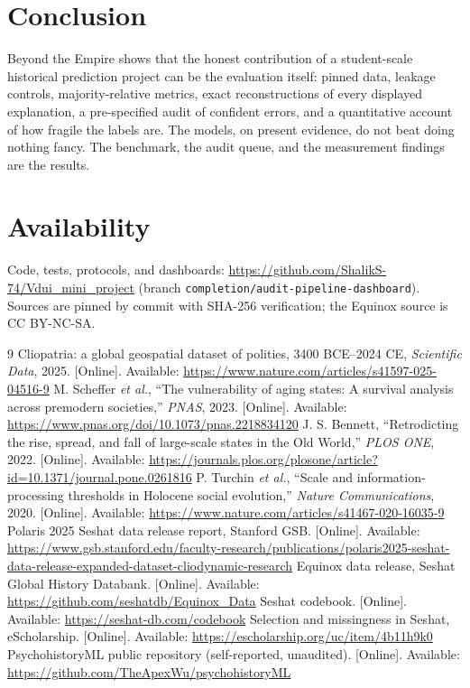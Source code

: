 \documentclass[conference]{IEEEtran}
\begin{document}
\section{Conclusion}
Beyond the Empire shows that the honest contribution of a student-scale historical
prediction project can be the evaluation itself: pinned data, leakage controls,
majority-relative metrics, exact reconstructions of every displayed explanation, a
pre-specified audit of confident errors, and a quantitative account of how fragile
the labels are. The models, on present evidence, do not beat doing nothing fancy.
The benchmark, the audit queue, and the measurement findings are the results.

\section*{Availability}
Code, tests, protocols, and dashboards: \url{https://github.com/ShalikS-74/Vdui_mini_project}
(branch \texttt{completion/audit-pipeline-dashboard}). Sources are pinned by commit
with SHA-256 verification; the Equinox source is CC BY-NC-SA.

\begin{thebibliography}{9}
Cliopatria: a global geospatial dataset of polities, 3400 BCE--2024 CE,
\emph{Scientific Data}, 2025. [Online]. Available:
\url{https://www.nature.com/articles/s41597-025-04516-9}
M. Scheffer \emph{et al.}, ``The vulnerability of aging states: A survival
analysis across premodern societies,'' \emph{PNAS}, 2023. [Online]. Available:
\url{https://www.pnas.org/doi/10.1073/pnas.2218834120}
J. S. Bennett, ``Retrodicting the rise, spread, and fall of large-scale states in
the Old World,'' \emph{PLOS ONE}, 2022. [Online]. Available:
\url{https://journals.plos.org/plosone/article?id=10.1371/journal.pone.0261816}
P. Turchin \emph{et al.}, ``Scale and information-processing thresholds in
Holocene social evolution,'' \emph{Nature Communications}, 2020. [Online].
Available: \url{https://www.nature.com/articles/s41467-020-16035-9}
Polaris 2025 Seshat data release report, Stanford GSB. [Online]. Available:
\url{https://www.gsb.stanford.edu/faculty-research/publications/polaris2025-seshat-data-release-expanded-dataset-cliodynamic-research}
Equinox data release, Seshat Global History Databank. [Online]. Available:
\url{https://github.com/seshatdb/Equinox_Data}
Seshat codebook. [Online]. Available: \url{https://seshat-db.com/codebook}
Selection and missingness in Seshat, eScholarship. [Online]. Available:
\url{https://escholarship.org/uc/item/4b11h9k0}
PsychohistoryML public repository (self-reported, unaudited). [Online]. Available:
\url{https://github.com/TheApexWu/psychohistoryML}
\end{thebibliography}
\end{document}
